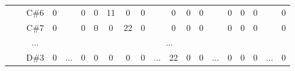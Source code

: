 \documentclass[12pt]{article}
\begin{document}
\begin{table}[!ht]
{\begin{tabular}{clcccccccccccccccccc}
                       & \multicolumn{1}{l|}{} & \multicolumn{1}{c|}{C\#6} & \multicolumn{1}{c|}{0}    & \multicolumn{1}{c|}{}                     & \multicolumn{1}{c|}{0}    & \multicolumn{1}{c|}{0}    & \multicolumn{1}{c|}{11}   & \multicolumn{1}{c|}{0}    & \multicolumn{1}{c|}{0}  & \multicolumn{1}{c|}{}                     & \multicolumn{1}{c|}{0}    & \multicolumn{1}{c|}{0}    & \multicolumn{1}{c|}{0}    & \multicolumn{1}{c|}{}                     & \multicolumn{1}{c|}{0}  & \multicolumn{1}{c|}{0}  & \multicolumn{1}{c|}{0}  & \multicolumn{1}{c|}{}                     & \multicolumn{1}{c|}{0}  \\ \cline{3-4} \cline{6-10} \cline{12-14} \cline{16-18} \cline{20-20} 
                       & \multicolumn{1}{l|}{} & \multicolumn{1}{c|}{C\#7} & \multicolumn{1}{c|}{0}    & \multicolumn{1}{c|}{}                     & \multicolumn{1}{c|}{0}    & \multicolumn{1}{c|}{0}    & \multicolumn{1}{c|}{0}    & \multicolumn{1}{c|}{22}   & \multicolumn{1}{c|}{0}  & \multicolumn{1}{c|}{}                     & \multicolumn{1}{c|}{0}    & \multicolumn{1}{c|}{0}    & \multicolumn{1}{c|}{0}    & \multicolumn{1}{c|}{}                     & \multicolumn{1}{c|}{0}  & \multicolumn{1}{c|}{0}  & \multicolumn{1}{c|}{0}  & \multicolumn{1}{c|}{}                     & \multicolumn{1}{c|}{0}  \\ \cline{3-4} \cline{6-10} \cline{12-14} \cline{16-18} \cline{20-20} 
                       & \multicolumn{1}{l|}{} & \multicolumn{1}{c|}{...}  & \multicolumn{17}{c|}{...}                                                                                                                                                                                                                                                                                                                                                                                                                                                                                                                       \\ \cline{3-4} \cline{6-10} \cline{12-14} \cline{16-18} \cline{20-20} 
                       & \multicolumn{1}{l|}{} & \multicolumn{1}{c|}{D\#3} & \multicolumn{1}{c|}{0}    & \multicolumn{1}{c|}{...}                  & \multicolumn{1}{c|}{0}    & \multicolumn{1}{c|}{0}    & \multicolumn{1}{c|}{0}    & \multicolumn{1}{c|}{0}    & \multicolumn{1}{c|}{0}  & \multicolumn{1}{c|}{...}                  & \multicolumn{1}{c|}{22}   & \multicolumn{1}{c|}{0}    & \multicolumn{1}{c|}{0}    & \multicolumn{1}{c|}{...}                  & \multicolumn{1}{c|}{0}  & \multicolumn{1}{c|}{0}  & \multicolumn{1}{c|}{0}  & \multicolumn{1}{c|}{...}                  & \multicolumn{1}{c|}{0}  \\ \cline{3-4} \cline{6-10} \cline{12-14} \cline{16-18} \cline{20-20} 

\end{tabular}}
\end{table}
\end{document}

